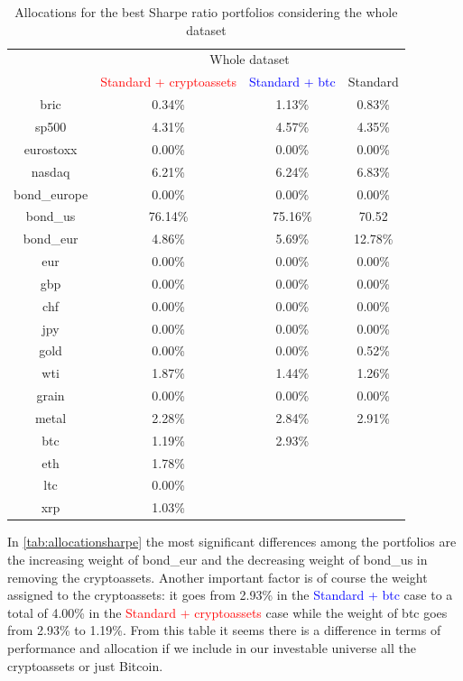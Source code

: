 \begin{table}[H]
    \centering
    \begin{tabular}{c|ccc|}
         &  \multicolumn{3}{c|}{Whole dataset} \\
         \cline{2-4}
          & \textcolor{red}{Standard + cryptoassets} & \textcolor{blue}{Standard + btc} & Standard\\
          \hline
          bric & 0.34\% & 1.13\% & 0.83\% \\
          sp500 & 4.31\% & 4.57\% & 4.35\% \\
          eurostoxx & 0.00\% & 0.00\% & 0.00\%\\
          nasdaq & 6.21\% & 6.24\% & 6.83\% \\
          bond\_europe & 0.00\% & 0.00\% & 0.00\%\\
          bond\_us & 76.14\% & 75.16\% & 70.52\\
          bond\_eur & 4.86\% & 5.69\% & 12.78\%\\
          eur & 0.00\% & 0.00\% & 0.00\%\\
          gbp & 0.00\% & 0.00\% & 0.00\%\\
          chf & 0.00\% & 0.00\% & 0.00\%\\
          jpy & 0.00\% & 0.00\% & 0.00\%\\
          gold & 0.00\% & 0.00\% & 0.52\%\\
          wti & 1.87\% & 1.44\% & 1.26\%\\
          grain & 0.00\% & 0.00\% & 0.00\%\\
          metal & 2.28\% & 2.84\% & 2.91\%\\
          btc & 1.19\% & 2.93\% & \\
          eth & 1.78\% & &\\
          ltc & 0.00\% & &\\
          xrp & 1.03\% & &\\
    \end{tabular}
    \caption{Allocations for the best Sharpe ratio portfolios considering the whole dataset}
    \label{tab:allocationsharpe}
\end{table}

In \autoref{tab:allocationsharpe} the most significant differences among the portfolios are the increasing weight of bond\_eur and the decreasing weight of bond\_us in removing the cryptoassets. Another important factor is of course the weight assigned to the cryptoassets: it goes from 2.93\% in the \textcolor{blue}{Standard + btc} case to a total of 4.00\% in the \textcolor{red}{Standard + cryptoassets} case while the weight of btc goes from 2.93\% to 1.19\%. From this table it seems there is a difference in terms of performance and allocation if we include in our investable universe all the cryptoassets or just Bitcoin.

